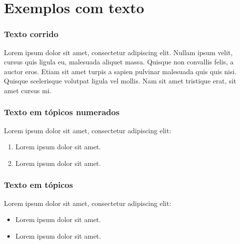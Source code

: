 \section{Exemplos com texto} %


\begin{frame}
	\frametitle{Texto corrido}
    Lorem ipsum dolor sit amet, consectetur adipiscing elit. Nullam ipsum velit, cursus quis ligula eu, malesuada aliquet massa. Quisque non convallis felis, a auctor eros. Etiam sit amet turpis a sapien pulvinar malesuada quis quis nisi. Quisque scelerisque volutpat ligula vel mollis. Nam sit amet tristique erat, sit amet cursus mi. 
\end{frame}


\begin{frame}
	\frametitle{Texto em tópicos numerados}
     Lorem ipsum dolor sit amet, consectetur  adipiscing elit:
    \begin{enumerate}
        \item Lorem ipsum dolor sit amet.
        \item Lorem ipsum dolor sit amet.
    \end{enumerate}
	
\end{frame}


\begin{frame}
	\frametitle{Texto em tópicos}
     Lorem ipsum dolor sit amet, consectetur adipiscing elit:
    \begin{itemize}
        \item Lorem ipsum dolor sit amet.
        \item Lorem ipsum dolor sit amet.
    \end{itemize}
	
\end{frame}


